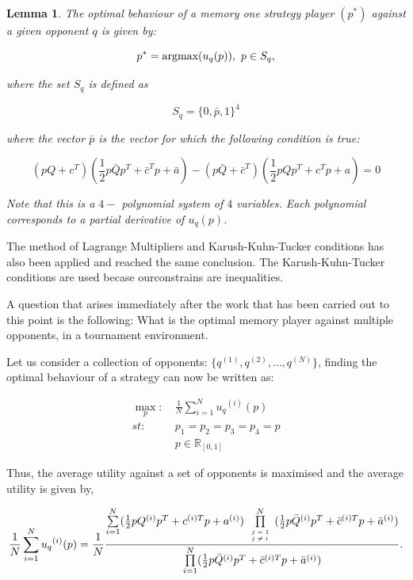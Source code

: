 \documentclass[10pt]{article}
\newcommand{\R}{\mathbb{R}}
\newtheorem{lemma}[theorem]{Lemma}
\begin{document}
\begin{lemma}\label{lemma:memone_best_response}
    The optimal behaviour of a memory one strategy player \((p^*)\) against a
    given opponent \(q\) is given by:
    
    \[p^* = \textnormal{argmax}(u_q(p)), \ p \in S_q,\]
    
    where the set \(S_q\) is defined as 
    
    \[S_q = \{0, \bar{p}, 1 \}^4 \]
    
    where the vector \(\bar{p}\) is the vector for which the following condition is true:
    
    {\small
    \begin{equation*}
        (pQ + c^T) ( \frac{1}{2} p  \bar{Q}  p^T + \bar{c}^T  p + \bar{a}) 
        - (p\bar{Q} + \bar{c}^T)( \frac{1}{2} p  Q  p^T + c^T p + a) = 0
    \end{equation*}}

    Note that this is a \(4-\) polynomial system of \(4\) variables. Each polynomial
    corresponds to a partial derivative of \(u_q(p)\).
\end{lemma}

The method of Lagrange Multipliers and Karush-Kuhn-Tucker conditions has also been
applied and reached the same conclusion. %
The Karush-Kuhn-Tucker conditions are used becase ourconstrains are inequalities.

A question that arises immediately after the work that has been carried out to
this point is the following: What is the optimal memory player against multiple
opponents, in a tournament environment.

Let us consider a collection of opponents: \(\{q^{(1)}, q^{(2)}, \dots, q^{(N)}\}\), 
finding the optimal behaviour of a strategy can now be written as:

\begin{equation}\label{eq:random_tournament_optimisation}
\begin{aligned}
\max_p: & \ \frac{1}{N} \sum_{i=1} ^ {N} {u_q}^{(i)} (p) 
\\
st: & \ p_1 = p_2 = p_3 = p_4 = p\\
    & \ p \in \R_{[0, 1]} 
\end{aligned}
\end{equation}

Thus, the average utility against a set of opponents is maximised and the average 
utility is given by,

\begin{equation}\label{eq:tournament_utility}
    \frac{1}{N} \sum\limits_{i=1} ^ {N} {u_q}^{(i)} (p) = \frac{1}{N}
    \frac{\sum\limits_{i=1} ^ {N} (\frac{1}{2} pQ^{(i)} p^T + c^{(i)T} p + a^ {(i)})
    \prod\limits_{\tiny\begin{array}{l} j=1 \\ j \neq i \end{array}} ^ 
    N (\frac{1}{2} p\bar{Q}^{(i)} p^T + \bar{c}^{(i)T} p + \bar{a}^ {(i)})}
    {\prod\limits_{i=1} ^ N (\frac{1}{2} p\bar{Q}^{(i)} p^T + \bar{c}^{(i)T} p + \bar{a}^ {(i)})}.
\end{equation}
\end{document}

